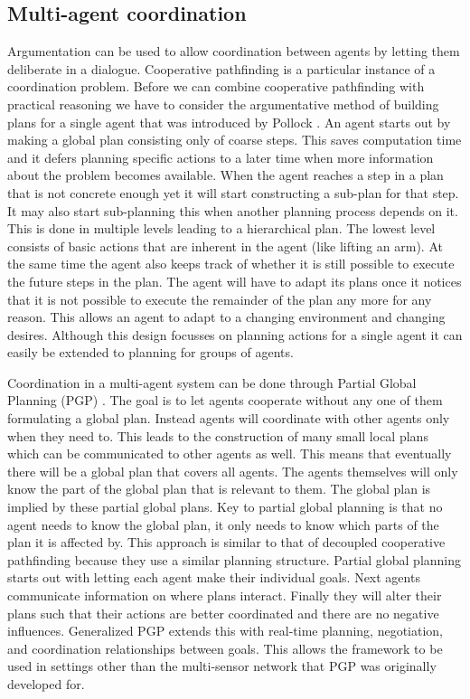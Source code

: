 \subsection{Multi-agent coordination}
Argumentation can be used to allow coordination between agents by letting them
deliberate in a dialogue. Cooperative pathfinding is a particular instance of a
coordination problem. Before we can combine cooperative pathfinding with
practical reasoning we have to consider the
argumentative method of building plans for a single agent that was introduced
by Pollock \cite{pollock1995}. An agent starts out by making a global plan
consisting only of coarse steps. This saves computation time and it defers
planning specific actions to a later time when more information about the
problem becomes available. When the agent reaches a step in a plan that is not
concrete enough yet it will start constructing a sub-plan for that step. It may
also start sub-planning this when another planning process depends on it. This
is done in
multiple levels leading to a hierarchical plan. The lowest level consists of
basic actions that are inherent in the agent (like lifting an arm). At the same
time the agent also keeps track of whether it is still possible to execute the
future steps in the plan. The agent will have to adapt its plans once it
notices that
it is not possible to execute the remainder of the plan
any more for any
reason. This allows an agent to adapt to a changing environment and changing
desires. Although this design focusses on planning actions for a single agent
it can easily be extended to planning for groups of agents.

Coordination in a multi-agent system can be done through Partial Global
Planning (PGP) \cite[pp. 202--204]{durfee1991,decker1992,woodridge2009}. The
goal is to
let agents cooperate without any one of them formulating a global plan. Instead
agents will coordinate with other agents only when they need to. This leads to
the construction of many small local plans which can be communicated to other
agents as well. This means that eventually there will be a global plan that
covers all agents. The agents themselves will only know the part of the global
plan that is relevant to them. The global plan is implied by these partial
global plans. Key to
partial global planning is that no agent needs to know the global plan, it only
needs to know which parts of the plan it is affected by. This approach is
similar to that of decoupled cooperative pathfinding because they use a similar
planning structure. Partial global planning starts out with letting each agent
make their individual goals. Next agents communicate information on where plans
interact. Finally they will alter their plans such that their actions are
better coordinated and there are no negative influences. Generalized PGP
\cite{decker1992} extends this with real-time planning, negotiation, and
coordination relationships between goals. This allows the framework to be used
in settings other than the multi-sensor network that PGP was originally
developed for.

